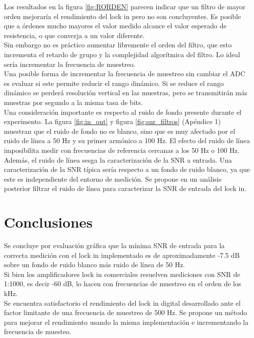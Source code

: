 \documentclass[11pt,a4paper]{extarticle}
\begin{document}
\begin{multicols}{2}
Los resultados en la figura \ref{fig:RORDEN} parecen indicar que un filtro de mayor orden mejoraría el rendimiento del lock in pero no son concluyentes. Es posible que a órdenes mucho mayores el valor medido alcance el valor esperado de resistencia, o que converja a un valor diferente.\\

Sin embargo no es práctico aumentar libremente el orden del filtro, que esto incrementa el retardo de grupo y la complejidad algorítmica del filtro. Lo ideal sería incrementar la frecuencia de muestreo.\\

Una posible forma de incrementar la frecuencia de muestreo sin cambiar el ADC es evaluar si este permite reducir el rango dinámico. Si se reduce el rango dinámico se perderá resolución vertical en las muestras, pero se transmitirán más muestras por segundo a la misma tasa de bits.\\

Una consideración importante es respecto al ruido de fondo presente durante el experimento. La figura \ref{fig:in_out} y figura \ref{fig:snr_filtros} (Apéndice 1) muestran que el ruido de fondo no es blanco, sino que es muy afectado por el ruido de línea a 50 Hz y su primer armónico a 100 Hz. 
El efecto del ruido de línea imposibilita medir con frecuencias de referencia cercanas a los 50 Hz o 100 Hz.\\

Además, el ruido de línea sesga la caracterización de la SNR a entrada. 
Una caracterización de la SNR típica sería respecto a un fondo de ruido blanco, ya que este es independiente del entorno de medición. 
Se propone en un análisis posterior filtrar el ruido de línea para caracterizar la SNR de entrada del lock in.

\section{Conclusiones}

Se concluye por evaluación gráfica que la mínima SNR de entrada para la correcta medición con el lock in implementado es de
aproximadamente -7.5 dB sobre un fondo de ruido blanco más ruido de línea de 50 Hz.\\

Si bien los amplificadores lock in comerciales resuelven 
mediciones con SNR de 1:1000, es decir -60 dB, lo hacen con frecuencias de muestreo en el orden de los kHz.\\

Se encuentra satisfactorio el rendimiento del lock in digital desarrollado ante 
el factor limitante de una frecuencia de muestreo de 500 Hz. Se propone un método para mejorar el rendimiento usando la misma implementación e incrementando la frecuencia de muesteo.\\




\end{multicols}
\end{document}
